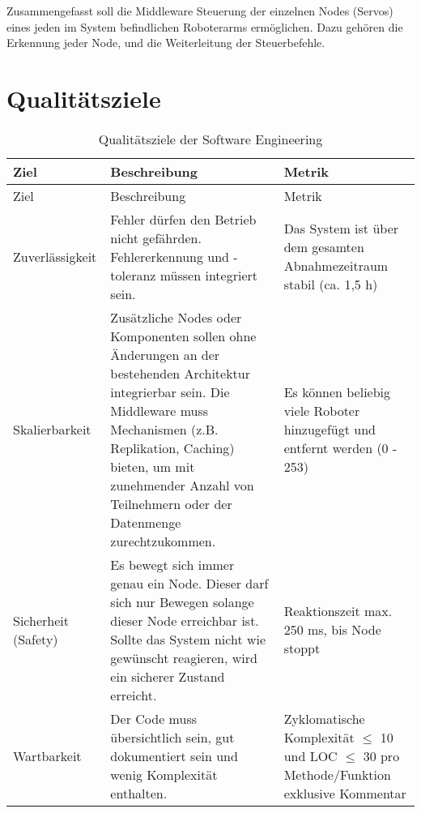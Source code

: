 Zusammengefasst soll die Middleware Steuerung der einzelnen Nodes (Servos) eines jeden im System befindlichen Roboterarms ermöglichen. Dazu gehören die Erkennung jeder Node, und die Weiterleitung der Steuerbefehle.

\newpage
\section{Qualitätsziele}
\begin{longtable}{|>{\raggedright\arraybackslash}p{4cm}|>{\raggedright\arraybackslash}p{5cm}|>{\raggedright\arraybackslash}p{5cm}|}
	\caption{Qualitätsziele der Software Engineering} \label{tab:seziele} \\
	\hline
	Ziel & Beschreibung & Metrik \\
	\hline
	\endfirsthead
	
	\hline
	Ziel & Beschreibung & Metrik \\
	\hline
	\endhead
	
	\hline
	\endfoot
	
	
	Zuverlässigkeit & 
	Fehler dürfen den Betrieb nicht gefährden. Fehlererkennung und -toleranz müssen integriert sein.
	& Das System ist über dem gesamten Abnahmezeitraum stabil (ca. 1,5 h)
	\\
	\hline
	Skalierbarkeit & 
	Zusätzliche Nodes oder Komponenten sollen ohne Änderungen an der bestehenden Architektur integrierbar sein. Die Middleware muss Mechanismen (z.B. Replikation, Caching) bieten, um mit zunehmender Anzahl von Teilnehmern oder der Datenmenge zurechtzukommen.
	& Es können beliebig viele Roboter hinzugefügt und entfernt werden (0 - 253)
	\\
	\hline
	Sicherheit (Safety) & 
	Es bewegt sich immer genau ein Node. Dieser darf sich nur Bewegen solange dieser Node erreichbar ist. Sollte das System nicht wie gewünscht reagieren, wird ein sicherer Zustand erreicht. 
	& Reaktionszeit max. 250 ms, bis Node stoppt
	\\
	\hline
	Wartbarkeit & 
	Der Code muss übersichtlich sein, gut dokumentiert sein und wenig Komplexität enthalten. 
	& Zyklomatische Komplexität $\leq$ 10 und LOC $\leq$ 30 pro Methode/Funktion exklusive Kommentar  
	

\end{longtable}
